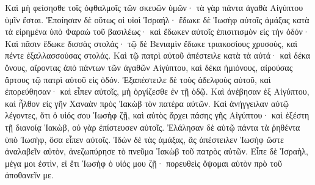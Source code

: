{Καὶ μὴ φείσησθε τοῖς ὀφθαλμοῖς τῶν σκευῶν ὑμῶν· τὰ γὰρ πάντα ἀγαθὰ Αἰγύπτου ὑμῖν ἔσται.
Ἐποίησαν δὲ οὕτως οἱ υἱοὶ Ἰσραήλ· ἔδωκε δὲ Ἰωσὴφ αὐτοῖς ἁμάξας κατὰ τὰ εἰρημένα ὑπὸ Φαραὼ τοῦ βασιλέως· καὶ ἔδωκεν αὐτοῖς ἐπισιτισμὸν εἰς τὴν ὁδόν·
Καὶ πᾶσιν ἔδωκε δισσὰς στολάς· τῷ δὲ Βενιαμὶν ἔδωκε τριακοσίους χρυσοὺς, καὶ πέντε ἐξαλλασσούσας στολάς.
Καὶ τῷ πατρὶ αὐτοῦ ἀπέστειλε κατὰ τὰ αὐτά· καὶ δέκα ὄνους, αἴροντας ἀπὸ πάντων τῶν ἀγαθῶν Αἰγύπτου, καὶ δέκα ἡμιόνους, αἰρούσας ἄρτους τῷ πατρὶ αὐτοῦ εἰς ὁδόν.
Ἐξαπέστειλε δὲ τοὺς ἀδελφοὺς αὐτοῦ, καὶ ἐπορεύθησαν· καὶ εἶπεν αὐτοῖς, μὴ ὀργίζεσθε ἐν τῇ ὁδῷ.
Καὶ ἀνέβησαν ἐξ Αἰγύπτου, καὶ ἦλθον εἰς γῆν Χαναὰν πρὸς Ἰακὼβ τὸν πατέρα αὐτῶν.
Καὶ ἀνήγγειλαν αὐτῷ λέγοντες, ὅτι ὁ υἱός σου Ἰωσὴφ ζῇ, καὶ αὐτὸς ἄρχει πάσης γῆς Αἰγύπτου· καὶ ἐξέστη τῇ διανοίᾳ Ἰακὼβ, οὐ γὰρ ἐπίστευσεν αὐτοῖς.
Ἐλάλησαν δὲ αὐτῷ πάντα τὰ ῥηθέντα ὑπὸ Ἰωσὴφ, ὅσα εἶπεν αὐτοῖς. Ἰδὼν δὲ τὰς ἁμάξας, ἃς ἀπέστειλεν Ἰωσὴφ ὥστε ἀναλαβεῖν αὐτὸν, ἀνεζωπύρησε τὸ πνεῦμα Ἰακὼβ τοῦ πατρὸς αὐτῶν.
Εἶπε δὲ Ἰσραὴλ, μέγα μοι ἐστὶν, εἰ ἔτι Ἰωσὴφ ὁ υἱός μου ζῇ· πορευθεὶς ὄψομαι αὐτὸν πρὸ τοῦ ἀποθανεῖν με.

}
